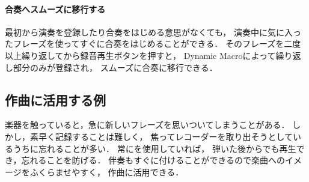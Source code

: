 \paragraph*{合奏へスムーズに移行する}
最初から演奏を登録したり合奏をはじめる意思がなくても，
演奏中に気に入ったフレーズを使ってすぐに合奏をはじめることができる．
そのフレーズを二度以上繰り返してから録音再生ボタンを押すと，
Dynamic Macroによって繰り返し部分のみが登録され，
スムーズに合奏に移行できる．

\subsection{作曲に活用する例}
楽器を触っていると，急に新しいフレーズを思いついてしまうことがある．
しかし，素早く記録することは難しく，
焦ってレコーダーを取り出そうとしているうちに忘れることが多い．
常に{\system}を使用していれば，
弾いた後からでも再生でき，忘れることを防げる．
伴奏もすぐに付けることができるので楽曲へのイメージをふくらませやすく，
作曲に活用できる．

